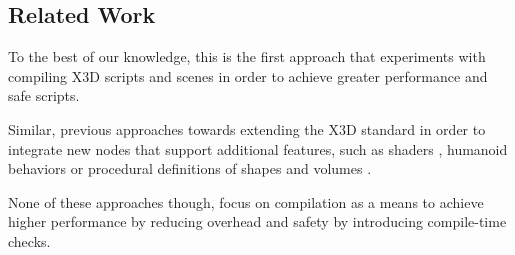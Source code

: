 \subsection{Related Work}
To the best of our knowledge, this is the first approach that experiments with compiling X3D scripts and scenes in order to achieve greater performance and safe scripts.

Similar, previous approaches towards extending the X3D standard in order to integrate new nodes that support additional features, such as shaders \cite{X3D_OGL_ES}, humanoid behaviors \cite{BEHAVIOR_3D} or procedural definitions of shapes and volumes \cite{FUNCTION_BASED_X3D, FUNCTION_BASED_HAPTIC_X3D}.

None of these approaches though, focus on compilation as a means to achieve higher performance by reducing overhead and safety by introducing compile-time checks.